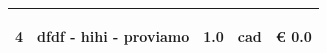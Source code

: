 \documentclass[a4paper]{article}
\begin{document}
\begin{tabular}{ | L{10mm} |  L{86mm} | L{12mm} | L{12mm} | L{16mm} | }
                                   
                                     \vspace{2.5mm}
                                     \begin{spacing}{0}
                                  4
                                     \end{spacing} &
                                     \vspace{2.5mm}
                                     \begin{spacing}{0}
                                  dfdf - hihi - \newline proviamo
                                     \end{spacing} &
                                     \vspace{2.5mm}
                                     \begin{spacing}{0}
                                  1.0
                                     \end{spacing} &
                                     \vspace{2.5mm}
                                     \begin{spacing}{0}
                                  cad
                                     \end{spacing} &
                                     \vspace{2.5mm}
                                     \begin{spacing}{0}
                                       \euro\hfill 
                                   0.0
                                     \end{spacing} \\
                                     \hline
    

\end{tabular}
\end{document}
